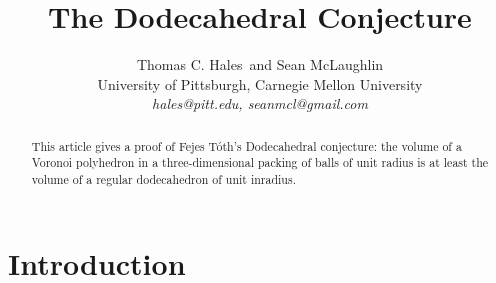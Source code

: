 \documentclass{article} %
\begin{document}
\title{The Dodecahedral Conjecture}
\author{Thomas C. Hales\ and Sean McLaughlin \\
        \normalsize{University of Pittsburgh, Carnegie Mellon University} \\
        \normalsize{\it{hales@pitt.edu, seanmcl@gmail.com}}}
\date{}
\maketitle

\begin{abstract}  
This article gives a proof of Fejes T\'oth's Dodecahedral conjecture:
the volume of a Voronoi polyhedron in a three-dimensional packing of
balls of unit radius is at least the volume of a regular dodecahedron
of unit inradius.
\end{abstract}


\section{Introduction}
\end{document}
